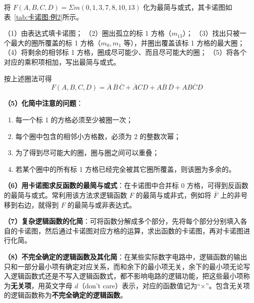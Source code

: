 \begin{longexample}
\label{ex:卡诺图化简2}
将 $F(A,B,C,D)=\Sigma m(0,1,3,7,8,10,13)$ 化为最简与或式，其卡诺图如表~\ref{tab:卡诺图:例2}所示。

\begin{solution}
	（1）由表达式填卡诺图；
	（2）圈出孤立的标 1 方格（$m_{13}$）；
	（3）找出只被一个最大的圈所覆盖的标 1 方格（$m_0,m_1$ 等），并圈出覆盖该标 1 方格的最大圈；
	（4）将剩余的相邻标 1 方格，圈成尽可能少、而且尽可能大的圈；
	（5）将各个对应的乘积项相加，写出最简与或式。

	按上述圈法可得
	\begin{equation}
		F(A,B,C,D)=\overline{A}\,\overline{B}\,\overline{C}+\overline{A}CD+A\overline{B}\,\overline{D}+AB\overline{C}D
		\label{eq:卡诺图:例2结果}
	\end{equation}
\end{solution}
\end{longexample}

\textbf{（5）化简中注意的问题}：
\begin{enumerate}
	\item 每一个标 1 的方格必须至少被圈一次；
	\item 每个圈中包含的相邻小方格数，必须为 2 的整数次幂；
	\item 为了得到尽可能大的圈，圈与圈之间可以重叠；
	\item 若某个圈中的所有标 1 方格已经完全被其它圈所覆盖，则该圈为多余的。
\end{enumerate}

\textbf{（6）用卡诺图求反函数的最简与或式}：在卡诺图中合并标 0 方格，可得到反函数的最简与或式。常利用该方法求逻辑函数 $F$ 的最简与或非式，例如将 $\overline{F}$ 上的非号移到右边，就得到 $F$ 的最简与或非表达式。

\textbf{（7）复杂逻辑函数的化简}：可将函数分解成多个部分，先将每个部分分别填入各自的卡诺图，然后通过卡诺图对应方格的运算，求出函数的卡诺图，再对卡诺图进行化简。

\textbf{（8）不完全确定的逻辑函数及其化简}：在某些实际数字电路中，逻辑函数的输出只和一部分最小项有确定对应关系，而和余下的最小项无关，余下的最小项无论写入逻辑函数式还是不写入逻辑函数式，都不影响电路的逻辑功能，把这些最小项称为\textbf{无关项}，用英文字母 $d$（don't care）表示，对应的函数值记为“×”。包含无关项的逻辑函数称为\textbf{不完全确定的逻辑函数}。

